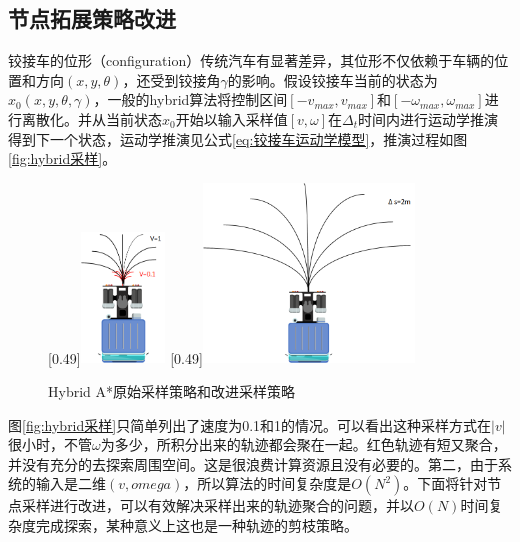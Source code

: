 \documentclass[master,academic]{ysuthesis} %
\begin{document}
		\subsection{节点拓展策略改进}
		铰接车的位形（configuration）传统汽车有显著差异，其位形不仅依赖于车辆的位置和方向$(x,y,\theta)$，还受到铰接角$\gamma$的影响。假设铰接车当前的状态为$x_0(x,y,\theta,\gamma)$，一般的hybrid算法将控制区间$[-v_{max},v_{max}]$和$[-\omega_{max},\omega_{max}]$进行离散化。并从当前状态$x_0$开始以输入采样值$[v,\omega]$在$\Delta_t$时间内进行运动学推演得到下一个状态，运动学推演见公式\ref{eq:铰接车运动学模型}，推演过程如图\ref{fig:hybrid采样}。
		\begin{figure}[!ht]
			\centering
			[0.49\textwidth]{\includegraphics[width=0.2\textwidth]{hybrid采样.png}}
			[0.49\textwidth]{\includegraphics[width=0.5\textwidth]{hybrid采样改进剪枝.png}}
			\caption{Hybrid A*原始采样策略和改进采样策略}
			\label{fig:Hybrid A*原始采样策略和改进采样策略}
		\end{figure}
		图\ref{fig:hybrid采样}只简单列出了速度为0.1和1的情况。可以看出这种采样方式在$|v|$很小时，不管$\omega$为多少，所积分出来的轨迹都会聚在一起。红色轨迹有短又聚合，并没有充分的去探索周围空间。这是很浪费计算资源且没有必要的。第二，由于系统的输入是二维$(v,omega)$，所以算法的时间复杂度是$O(N^2)$。下面将针对节点采样进行改进，可以有效解决采样出来的轨迹聚合的问题，并以$O(N)$时间复杂度完成探索，某种意义上这也是一种轨迹的剪枝策略。 
\end{document}
